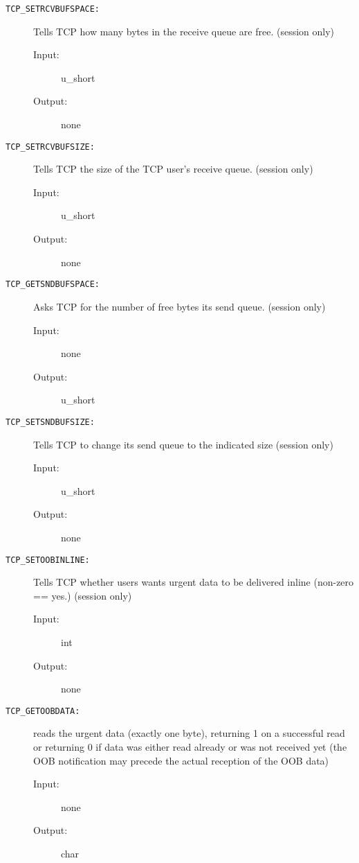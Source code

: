 \begin{description}
\item[{\tt TCP\_SETRCVBUFSPACE:}]
Tells TCP how many bytes in the receive queue are free.
(session only)
\begin{description}
\item[{\rm Input:}] u\_short
\item[{\rm Output:}] none
\end{description}


\item[{\tt TCP\_SETRCVBUFSIZE:}]
Tells TCP the size of the TCP user's receive queue.
(session only)
\begin{description}
\item[{\rm Input:}] u\_short
\item[{\rm Output:}] none
\end{description}


\item[{\tt TCP\_GETSNDBUFSPACE:}]
Asks TCP for the number of free bytes its send queue.
(session only)
\begin{description}
\item[{\rm Input:}] none
\item[{\rm Output:}] u\_short
\end{description}

\item[{\tt TCP\_SETSNDBUFSIZE:}]
Tells TCP to change its send queue to the indicated size
(session only)
\begin{description}
\item[{\rm Input:}] u\_short
\item[{\rm Output:}] none
\end{description}


\item[{\tt TCP\_SETOOBINLINE:}]
Tells TCP whether users wants urgent data to be delivered inline
(non-zero == yes.)  (session only)

\begin{description}

\item[{\rm Input:}] int
\item[{\rm Output:}] none

\end{description}

\item[{\tt TCP\_GETOOBDATA:}]
reads the urgent data (exactly one byte), returning 1 on a successful
read or returning 0
if data was either read already or was not received yet
(the OOB notification may precede the actual reception
of the OOB data)
\begin{description}
\item[{\rm Input:}] none
\item[{\rm Output:}] char
\end{description}



\end{description}
